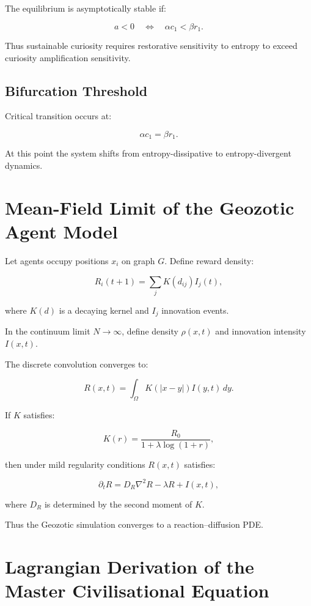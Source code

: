 \documentclass[12pt,a4paper]{article}
\theoremstyle{definition}
\begin{document}
The equilibrium is asymptotically stable if:

\[
a < 0
\quad \Longleftrightarrow \quad
\alpha c_1 < \beta r_1.
\]

Thus sustainable curiosity requires restorative sensitivity to entropy
to exceed curiosity amplification sensitivity.

\subsection*{Bifurcation Threshold}

Critical transition occurs at:

\[
\alpha c_1 = \beta r_1.
\]

At this point the system shifts from entropy-dissipative
to entropy-divergent dynamics.

\section{Mean-Field Limit of the Geozotic Agent Model}
\label{app:meanfield}

Let agents occupy positions $x_i$ on graph $G$.
Define reward density:

\[
R_i(t+1) = \sum_j K(d_{ij}) I_j(t),
\]

where $K(d)$ is a decaying kernel and $I_j$ innovation events.

In the continuum limit $N \to \infty$,
define density $\rho(x,t)$ and innovation intensity $I(x,t)$.

The discrete convolution converges to:

\[
R(x,t)
=
\int_\Omega K(|x-y|) I(y,t)\, dy.
\]

If $K$ satisfies:

\[
K(r) = \frac{R_0}{1+\lambda \log(1+r)},
\]

then under mild regularity conditions $R(x,t)$ satisfies:

\begin{equation}
\partial_t R
=
D_R \nabla^2 R
-
\lambda R
+
I(x,t),
\end{equation}

where $D_R$ is determined by the second moment of $K$.

Thus the Geozotic simulation converges to a reaction–diffusion PDE.

\section{Lagrangian Derivation of the Master Civilisational Equation}
\label{app:lagrangian_master}
\end{document}

